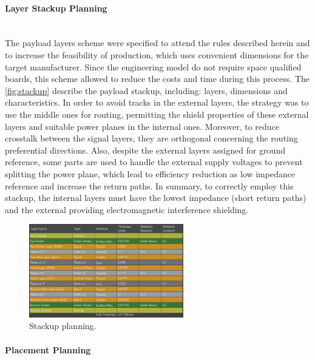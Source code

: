 \paragraph{Layer Stackup Planning} \mbox{}\\

The payload layers scheme were specified to attend the rules described herein and to increase the feasibility of production, which uses convenient dimensions for the target manufacturer. Since the engineering model do not require space qualified boards, this scheme allowed to reduce the costs and time during this process. The \autoref{fig:stackup} describe the payload stackup, including: layers, dimensions and characteristics. In order to avoid tracks in the external layers, the strategy was to use the middle ones for routing, permitting the shield properties of these external layers and suitable power planes in the internal ones. Moreover, to reduce crosstalk between the signal layers, they are orthogonal concerning the routing preferential directions. Also, despite the external layers assigned for ground reference, some parts are used to handle the external supply voltages to prevent splitting the power plane, which lead to efficiency reduction as low impedance reference and increase the return paths. In summary, to correctly employ this stackup, the internal layers must have the lowest impedance (short return paths) and the external providing electromagnetic interference shielding.  

\begin{figure}[!ht]
    \begin{center}
        \includegraphics[width=0.6\textwidth]{figures/stackup.png}
        \caption{Stackup planning.}
        \label{fig:stackup}
    \end{center}
\end{figure}

\paragraph{Placement Planning} \mbox{}\\

